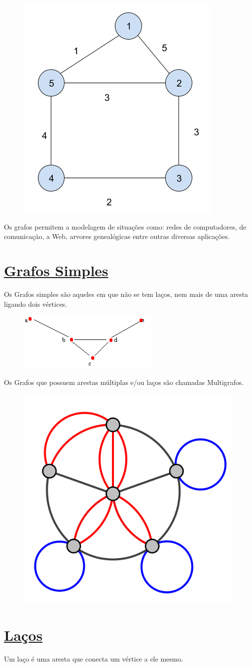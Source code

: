 \documentclass{article}
\begin{document}
\begin{figure}[H]
	\centering
	\includegraphics[width=0.2\linewidth]{"Figuras/Grafos -1"}
	\label{fig:grafo1}
\end{figure}

		Os grafos permitem a modelagem de situações como: redes de computadores, de comunicação, a Web, arvores genealógicas entre outras diversas aplicações.\vspace*{0.5cm}
		
	\section{{\Large \underline{Grafos Simples}}}
		Os Grafos simples são aqueles em que não se tem laços, nem mais de uma aresta ligando dois vértices.
		
\begin{figure}[H]
	\centering
	\includegraphics[width=0.2\linewidth]{"Figuras/Grafos -2"}
	\label{fig:grafos2}
\end{figure}
		
		Os Grafos que possuem arestas múltiplas e/ou laços são chamadas Multigrafos.
		
\begin{figure}[H]
	\centering
	\includegraphics[width=0.2\linewidth]{"Figuras/Grafo -4"}
	\label{fig:grafo4}
\end{figure}\vspace*{0.5cm}

	\section{{\Large \underline{Laços}}}
		Um laço é uma aresta que conecta um vértice a ele mesmo.
	
\end{document}
